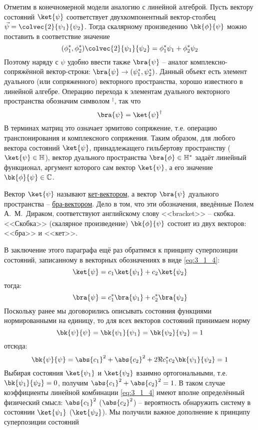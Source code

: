 Отметим в конечномерной модели аналогию с линейной алгеброй. Пусть вектору состояний $\ket{\psi}$ соответствует двухкомпонентный вектор-столбец $\vec{\psi} = \colvec{2}{\psi_1}{\psi_2}$. Тогда скалярному произведению $\bk{\phi}{\psi}$ можно поставить в соответствие значение%
%
$$
(\phi_1^*, \phi_2^*) \colvec{2}{\psi_1}{\psi_2} = \phi_1^*\psi_1 + \phi_2^* \psi_2
$$%
%
Поэтому наряду с $\psi$ удобно ввести также $\bra{\psi}$ -- аналог комплексно-сопряжённой вектор-строки: $\bra{\psi} \to (\psi_1^*, \psi_2^*)$. Данный объект есть элемент дуального (или сопряженного) векторного пространства, хорошо известного в линейной алгебре. Операцию перехода к элементам дуального векторного пространства обозначим символом $^\dag$, так что%
%
$$
\bra{\psi} = \ket{\psi}^\dag
$$%
%
В терминах матриц это означает эрмитово сопряжение, т.е. операцию транспонирования и комплексного сопряжения. Таким образом, для любого вектора состояний $\ket{\psi}$, принадлежащего гильбертову пространству ($\ket{\psi} \in \mathbb{H}$), вектор дуального пространства $\bra{\phi} \in \mathbb{H}^*$ задаёт линейный функционал, аргумент которого сам вектор $\ket{\psi}$, а его значение $\bk{\phi}{\psi} \in \mathbb{C}$.

Вектор $\ket{\psi}$ называют \underline{кет-вектором}, а вектор $\bra{\psi}$ дуального пространства -- \underline{бра-вектором}. Дело в том, что эти обозначения, введённые Полем А.~М.~Дираком, соответствуют английскому слову <<bracket>> -- скобка. <<Скобка>> (скалярное произведение) $\bk{\phi}{\psi}$ состоит из двух векторов: <<бра>> и <<кет>>.

В заключение этого параграфа ещё раз обратимся к принципу суперпозиции состояний, записанному в векторных обозначениях в виде \eqref{eq:3_1_4}:%
%
$$
\ket{\psi} = c_1 \ket{\psi_1} + c_2 \ket{\psi_2}
$$%
%
тогда:%
%
$$
\bra{\psi} = c_1^* \bra{\psi_1} + c_2^* \bra{\psi_2}
$$%
%
Поскольку ранее мы договорились описывать состояния функциями нормированными на единицу, то для всех векторов состояний принимаем норму%
%
$$
\bk{\psi}{\psi} = \bk{\psi_1}{\psi_1} = \bk{\psi_2}{\psi_2} = 1
$$%
%
отсюда:%
%
$$
\bk{\psi}{\psi} = \abs{c_1}^2 + \abs{c_2}^2 + 2 \Re{c_1^* c_2 \bk{\psi_1}{\psi_2}} = 1
$$%
%
Выбирая состояния $\ket{\psi_1}$ и $\ket{\psi_2}$ взаимно ортогональными, т.е. $\bk{\psi_1}{\psi_2} = 0$, получим $\abs{c_1}^2 + \abs{c_2}^2 = 1$. В таком случае коэффициенты линейной комбинации \eqref{eq:3_1_4} имеют вполне определённый физический смысл: $\abs{c_1}^2$ ($\abs{c_2}^2$) -- вероятность обнаружить систему в состоянии $\ket{\psi_1}$ ($\ket{\psi_2}$). Мы получили важное дополнение к принципу суперпозиции состояний

